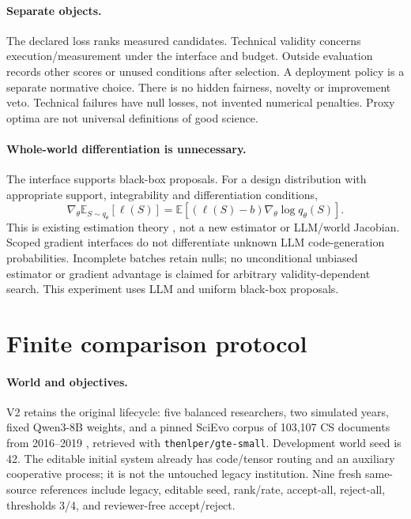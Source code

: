 \documentclass{article}
\begin{document}
\paragraph{Separate objects.}
The declared loss ranks measured candidates. Technical validity concerns
execution/measurement under the interface and budget. Outside evaluation
records other scores or unused conditions after selection. A deployment policy
is a separate normative choice. There is no hidden fairness, novelty or
improvement veto. Technical failures have null losses, not invented numerical
penalties. Proxy optima are not universal definitions of good science.

\paragraph{Whole-world differentiation is unnecessary.}
The interface supports black-box proposals. For a design distribution with
appropriate support, integrability and differentiation conditions,
\begin{equation}
 \nabla_\theta\mathbb{E}_{S\sim q_\theta}[\ell(S)]
 =\mathbb{E}[(\ell(S)-b)\nabla_\theta\log q_\theta(S)].
\end{equation}
This is existing estimation theory \citep{parmas2021unified}, not a new estimator
or LLM/world Jacobian. Scoped gradient interfaces do not differentiate unknown
LLM code-generation probabilities. Incomplete batches retain nulls; no
unconditional unbiased estimator or gradient advantage is claimed for arbitrary
validity-dependent search. This experiment uses LLM and uniform black-box proposals.

\section{Finite comparison protocol}
\label{sec:protocol}
\paragraph{World and objectives.}
V2 retains the original lifecycle: five balanced researchers, two simulated
years, fixed Qwen3-8B weights, and a pinned SciEvo corpus of 103,107 CS documents
from 2016--2019 \citep{jin2024scievo}, retrieved with \texttt{thenlper/gte-small}.
Development world seed is 42. The editable initial system already has code/tensor
routing and an auxiliary cooperative process; it is not the untouched legacy
institution. Nine fresh same-source references include legacy, editable seed,
rank/rate, accept-all, reject-all, thresholds 3/4, and reviewer-free accept/reject.
\end{document}
